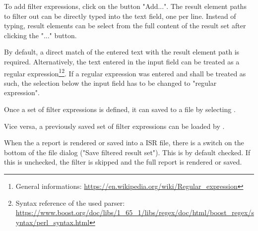To add filter expressions, click on the button "Add...".
The result element paths to filter out can be directly typed into the text field, one per line.
Instead of typing, result elements can be select from the full content of the result set after clicking the "..." button.

By default, a direct match of the entered text with the result element path is required.
Alternatively, the text entered in the input field can be treated as a regular expression\footnote{General informations: \url{https://en.wikipedia.org/wiki/Regular_expression}}\footnote{Syntax reference of the used parser: \url{https://www.boost.org/doc/libs/1_65_1/libs/regex/doc/html/boost_regex/syntax/perl_syntax.html}}.
If a regular expression was entered and shall be treated as such, the selection below the input field has to be changed to "regular expression".

Once a set of filter expressions is defined, it can saved to a file by selecting .

Vice versa, a previously saved set of filter expressions can be loaded by .

When the a report is rendered or saved into a ISR file, there is a switch on the bottom of the file dialog ("Save filtered result set").
This is by default checked.
If this is unchecked, the filter is skipped and the full report is rendered or saved.